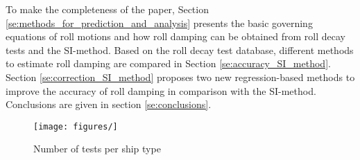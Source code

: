 To make the completeness of the paper, Section \ref{se:methods_for_prediction_and_analysis} presents the basic governing equations of roll motions and how roll damping can be obtained from roll decay tests and the SI-method. 
Based on the roll decay test database, different methods to estimate roll damping are compared in Section \ref{se:accuracy_SI_method}. Section \ref{se:correction_SI_method} proposes two new regression-based methods to improve the accuracy of roll damping in comparison with the SI-method. Conclusions are given in section \ref{se:conclusions}.  

\begin{figure}[H]
    \centering
    \texttt{[image: figures/]}
    \caption{Number of tests per ship type}
    \label{fig:ship_types}
\end{figure}